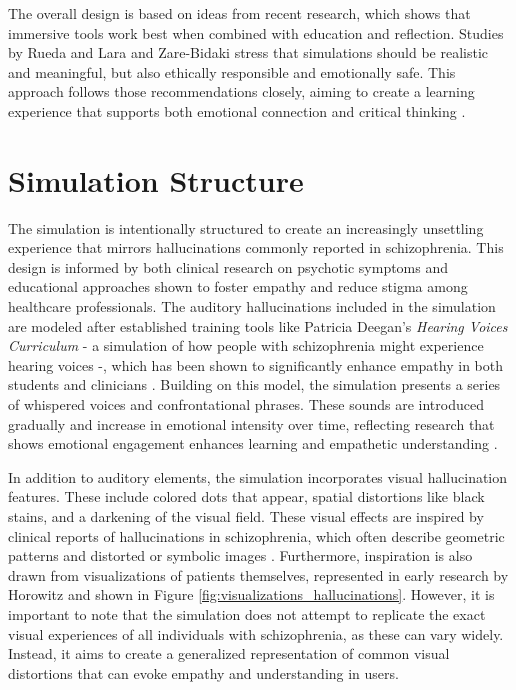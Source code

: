 \vspace{1em}
The overall design is based on ideas from recent research, which shows that immersive tools work best when combined with education and reflection. Studies by Rueda and Lara and Zare-Bidaki \cite{Zare-Bidaki2022} stress that simulations should be realistic and meaningful, but also ethically responsible and emotionally safe. This approach follows those recommendations closely, aiming to create a learning experience that supports both emotional connection and critical thinking \cite{Rueda2020,Zare-Bidaki2022}.

\section{Simulation Structure}

The simulation is intentionally structured to create an increasingly unsettling experience that mirrors hallucinations commonly reported in schizophrenia. This design is informed by both clinical research on psychotic symptoms and educational approaches shown to foster empathy and reduce stigma among healthcare professionals. The auditory hallucinations included in the simulation are modeled after established training tools like Patricia Deegan’s \textit{Hearing Voices Curriculum} - a simulation of how people with schizophrenia might experience hearing voices -, which has been shown to significantly enhance empathy in both students and clinicians \cite{Hsia2022}. Building on this model, the simulation presents a series of whispered voices and confrontational phrases. These sounds are introduced gradually and increase in emotional intensity over time, reflecting research that shows emotional engagement enhances learning and empathetic understanding \cite{Skoy2016}.

\vspace{1em}

In addition to auditory elements, the simulation incorporates visual hallucination features. These include colored dots that appear, spatial distortions like black stains, and a darkening of the visual field. These visual effects are inspired by clinical reports of hallucinations in schizophrenia, which often describe geometric patterns and distorted or symbolic images \cite{Silverstein2021,Vanommen2019}. Furthermore, inspiration is also drawn from visualizations of patients themselves, represented in early research by Horowitz \cite{Horowitz1964} and shown in Figure \ref{fig:visualizations_hallucinations}. However, it is important to note that the simulation does not attempt to replicate the exact visual experiences of all individuals with schizophrenia, as these can vary widely. Instead, it aims to create a generalized representation of common visual distortions that can evoke empathy and understanding in users.

